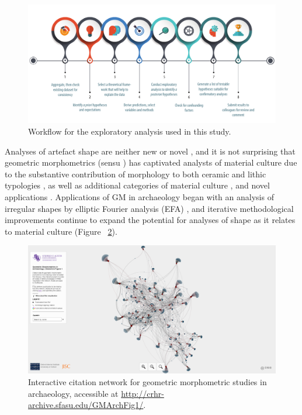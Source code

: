 \documentclass[review]{elsarticle}
\begin{document}
\begin{figure}[ht]\centering
\includegraphics[width=\linewidth]{figexan.pdf}
\caption{Workflow for the exploratory analysis used in this study.}
\label{fig:exan}
\end{figure}

Analyses of artefact shape are neither new or novel \citep{RN11779}, and it is not surprising that geometric morphometrics (sensu \citet{RN11559}) has captivated analysts of material culture due to the substantive contribution of morphology to both ceramic \citep{RN1752,RN11631,RN4335} and lithic typologies \citep{RN11529,RN11528,RN20853,RN11534}, as well as additional categories of material culture \citep{RN1737,RN4374,RN11527}, and novel applications \citep{RN11543,RN11544}. Applications of GM in archaeology began with an analysis of irregular shapes by elliptic Fourier analysis (EFA) \citep{RN4379}, and iterative methodological improvements continue to expand the potential for analyses of shape as it relates to material culture (Figure ~\ref{fig:network}).

\begin{figure}[ht]\centering
\includegraphics[width=\linewidth]{fignet.png}
\caption{Interactive citation network for geometric morphometric studies in archaeology, accessible at \href{http://crhr-archive.sfasu.edu/GMArchFig1/}{http://crhr-archive.sfasu.edu/GMArchFig1/}.}
\label{fig:network}
\end{figure}
\end{document}
